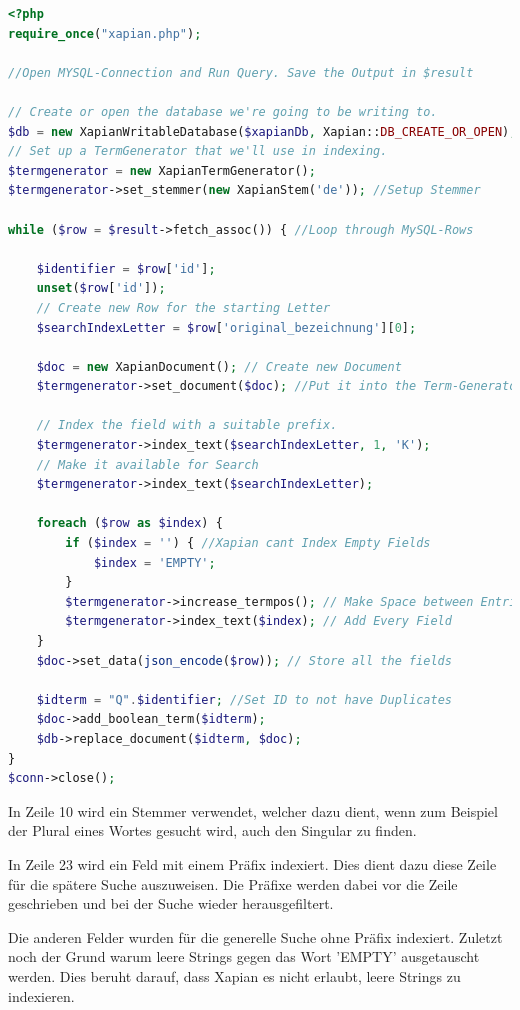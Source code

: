 \begin{lstlisting}[language=php, frame=single, label={lst:XapPhp}, morekeywords={type,uninvertible,indexed,stored,field,multiValued, name}] 
<?php
require_once("xapian.php");

//Open MYSQL-Connection and Run Query. Save the Output in $result

// Create or open the database we're going to be writing to.
$db = new XapianWritableDatabase($xapianDb, Xapian::DB_CREATE_OR_OPEN);
// Set up a TermGenerator that we'll use in indexing.
$termgenerator = new XapianTermGenerator();
$termgenerator->set_stemmer(new XapianStem('de')); //Setup Stemmer

while ($row = $result->fetch_assoc()) { //Loop through MySQL-Rows

	$identifier = $row['id'];
	unset($row['id']);
	// Create new Row for the starting Letter
	$searchIndexLetter = $row['original_bezeichnung'][0];

	$doc = new XapianDocument(); // Create new Document
	$termgenerator->set_document($doc); //Put it into the Term-Generator

	// Index the field with a suitable prefix.
	$termgenerator->index_text($searchIndexLetter, 1, 'K'); 
	// Make it available for Search
	$termgenerator->index_text($searchIndexLetter); 

	foreach ($row as $index) {
		if ($index = '') { //Xapian cant Index Empty Fields
			$index = 'EMPTY';
		}
		$termgenerator->increase_termpos(); // Make Space between Entries
		$termgenerator->index_text($index); // Add Every Field
	}
	$doc->set_data(json_encode($row)); // Store all the fields

	$idterm = "Q".$identifier; //Set ID to not have Duplicates
	$doc->add_boolean_term($idterm);
	$db->replace_document($idterm, $doc);
}
$conn->close();
\end{lstlisting}

In Zeile 10 wird ein Stemmer verwendet, welcher dazu dient, wenn zum Beispiel der Plural eines Wortes gesucht wird, auch den Singular zu finden.

In Zeile 23 wird ein Feld mit einem Präfix indexiert. Dies dient dazu diese Zeile für die spätere Suche auszuweisen. Die Präfixe werden dabei vor die Zeile geschrieben und bei der Suche wieder herausgefiltert. 

Die anderen Felder wurden für die generelle Suche ohne Präfix indexiert. Zuletzt noch der Grund warum leere Strings gegen das Wort 'EMPTY' ausgetauscht werden. Dies beruht darauf, dass Xapian es nicht erlaubt, leere Strings zu indexieren.

